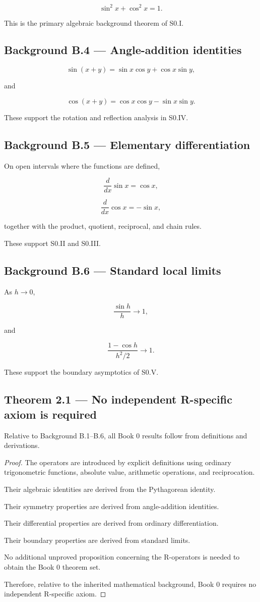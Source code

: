 \documentclass[11pt,oneside,openany]{book}
\newcommand{\PCsubsection}[1]{%
  \subsection*{#1}%
}
\begin{document}
\[
\boxed{ \sin^2x+\cos^2x=1. }
\]

This is the primary algebraic background theorem of S0.I.

\PCsubsection{Background B.4 --- Angle-addition identities}

\[
\sin(x+y) = \sin x\cos y+\cos x\sin y,
\]

and

\[
\cos(x+y) = \cos x\cos y-\sin x\sin y.
\]

These support the rotation and reflection analysis in S0.IV.

\PCsubsection{Background B.5 --- Elementary differentiation}

On open intervals where the functions are defined,

\[
\frac{d}{dx}\sin x=\cos x,
\]

\[
\frac{d}{dx}\cos x=-\sin x,
\]

together with the product, quotient, reciprocal, and chain rules.

These support S0.II and S0.III.

\PCsubsection{Background B.6 --- Standard local limits}

As \(h\to0\),

\[
\frac{\sin h}{h}\to1,
\]

and

\[
\frac{1-\cos h}{h^2/2}\to1.
\]

These support the boundary asymptotics of S0.V.

\PCsubsection{Theorem 2.1 --- No independent R-specific axiom is required}

Relative to Background B.1–B.6, all Book 0 results follow from definitions and derivations.

\begin{proof}
The operators are introduced by explicit definitions using ordinary trigonometric functions, absolute value, arithmetic operations, and reciprocation.

Their algebraic identities are derived from the Pythagorean identity.

Their symmetry properties are derived from angle-addition identities.

Their differential properties are derived from ordinary differentiation.

Their boundary properties are derived from standard limits.

No additional unproved proposition concerning the R-operators is needed to obtain the Book 0 theorem set.

Therefore, relative to the inherited mathematical background, Book 0 requires no independent R-specific axiom.

\end{proof}
\end{document}

